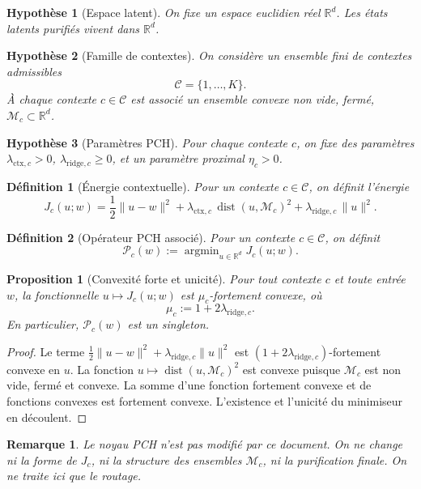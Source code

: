 \documentclass[11pt,a4paper]{article}
\newtheorem{definition}{Définition}[section]
\newtheorem{assumption}{Hypothèse}[section]
\newtheorem{proposition}{Proposition}[section]
\newtheorem{remark}{Remarque}[section]
\DeclareMathOperator{\argmin}{argmin}
\DeclareMathOperator{\dist}{dist}
\newcommand{\R}{\mathbb R}
\newcommand{\Mcal}{\mathcal M}
\newcommand{\Ccal}{\mathcal C}
\newcommand{\Pcal}{\mathcal P}
\begin{document}
\begin{assumption}[Espace latent]
On fixe un espace euclidien réel \(\R^d\). Les états latents purifiés vivent dans \(\R^d\).
\end{assumption}

\begin{assumption}[Famille de contextes]
On considère un ensemble fini de contextes admissibles
\[
\Ccal = \{1,\dots,K\}.
\]
À chaque contexte \(c\in\Ccal\) est associé un ensemble convexe non vide, fermé, \(\Mcal_c\subset\R^d\).
\end{assumption}

\begin{assumption}[Paramètres PCH]
Pour chaque contexte \(c\), on fixe des paramètres \(\lambda_{\mathrm{ctx},c}>0\), \(\lambda_{\mathrm{ridge},c}\ge 0\), et un paramètre proximal \(\eta_c>0\).
\end{assumption}

\begin{definition}[Énergie contextuelle]
Pour un contexte \(c\in\Ccal\), on définit l'énergie
\[
J_c(u;w)
=
\frac12\|u-w\|^2
+
\lambda_{\mathrm{ctx},c}\,\dist(u,\Mcal_c)^2
+
\lambda_{\mathrm{ridge},c}\,\|u\|^2.
\]
\end{definition}

\begin{definition}[Opérateur PCH associé]
Pour un contexte \(c\in\Ccal\), on définit
\[
\Pcal_c(w)
:=
\argmin_{u\in\R^d} J_c(u;w).
\]
\end{definition}

\begin{proposition}[Convexité forte et unicité]
Pour tout contexte \(c\) et toute entrée \(w\), la fonctionnelle \(u\mapsto J_c(u;w)\) est \(\mu_c\)-fortement convexe, où
\[
\mu_c:=1+2\lambda_{\mathrm{ridge},c}.
\]
En particulier, \(\Pcal_c(w)\) est un singleton.
\end{proposition}

\begin{proof}
Le terme \(\frac12\|u-w\|^2+\lambda_{\mathrm{ridge},c}\|u\|^2\) est \((1+2\lambda_{\mathrm{ridge},c})\)-fortement convexe en \(u\). La fonction \(u\mapsto \dist(u,\Mcal_c)^2\) est convexe puisque \(\Mcal_c\) est non vide, fermé et convexe. La somme d'une fonction fortement convexe et de fonctions convexes est fortement convexe. L'existence et l'unicité du minimiseur en découlent.
\end{proof}

\begin{remark}
Le noyau PCH n'est pas modifié par ce document. On ne change ni la forme de \(J_c\), ni la structure des ensembles \(\Mcal_c\), ni la purification finale. On ne traite ici que le routage.
\end{remark}
\end{document}
